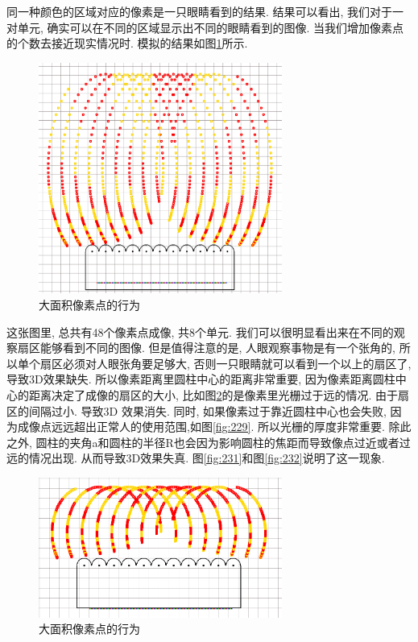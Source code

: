 \documentclass[a4paper, 11pt]{article}
\begin{document}
\begin{CJK}{UTF8}{gbsn}
同一种颜色的区域对应的像素是一只眼睛看到的结果. 结果可以看出, 我们对于一对单元, 确实可以在不同的区域显示出不同的眼睛看到的图像. 当我们增加像素点的个数去接近现实情况时. 模拟的结果如图\ref{fig:225}所示.
\begin{figure}[h!]
  \centerline{\includegraphics[width=8cm]{225.png}}
  \caption{大面积像素点的行为}
  \label{fig:225}
\end{figure}

这张图里, 总共有48个像素点成像, 共8个单元. 我们可以很明显看出来在不同的观察扇区能够看到不同的图像. 但是值得注意的是, 人眼观察事物是有一个张角的, 所以单个扇区必须对人眼张角要足够大, 否则一只眼睛就可以看到一个以上的扇区了, 导致3D效果缺失. 所以像素距离里圆柱中心的距离非常重要, 因为像素距离圆柱中心的距离决定了成像的扇区的大小, 比如图\ref{fig:228}的是像素里光栅过于远的情况. 由于扇区的间隔过小. 导致3D 效果消失. 同时, 如果像素过于靠近圆柱中心也会失败, 因为成像点远远超出正常人的使用范围,如图\ref{fig:229}. 所以光栅的厚度非常重要. 除此之外, 圆柱的夹角a和圆柱的半径R也会因为影响圆柱的焦距而导致像点过近或者过远的情况出现. 从而导致3D效果失真. 图\ref{fig:231}和图\ref{fig:232}说明了这一现象.
\begin{figure}[h!]
  \centerline{\includegraphics[width=8cm]{228.png}}
  \caption{大面积像素点的行为}
  \label{fig:228}
\end{figure}


\end{CJK}
\end{document}
